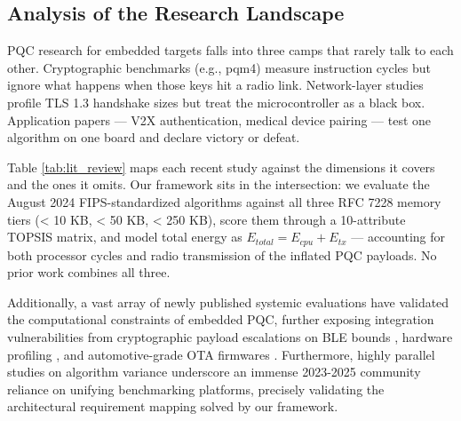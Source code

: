 \subsection{Analysis of the Research Landscape}

PQC research for embedded targets falls into three camps that rarely talk to each other. Cryptographic benchmarks (e.g., pqm4) measure instruction cycles but ignore what happens when those keys hit a radio link. Network-layer studies profile TLS 1.3 handshake sizes but treat the microcontroller as a black box. Application papers — V2X authentication, medical device pairing — test one algorithm on one board and declare victory or defeat.

Table \ref{tab:lit_review} maps each recent study against the dimensions it covers and the ones it omits. Our framework sits in the intersection: we evaluate the August 2024 FIPS-standardized algorithms against all three RFC 7228 memory tiers (< 10 KB, < 50 KB, < 250 KB), score them through a 10-attribute TOPSIS matrix, and model total energy as $E_{total} = E_{cpu} + E_{tx}$ — accounting for both processor cycles and radio transmission of the inflated PQC payloads. No prior work combines all three.

Additionally, a vast array of newly published systemic evaluations \cite{marshall2023profiling, beck2024energy, kampanakis2024analysis, becker2024evaluating, wang2025comprehensive} have validated the computational constraints of embedded PQC, further exposing integration vulnerabilities from cryptographic payload escalations on BLE bounds \cite{amin2024experimental}, hardware profiling \cite{stebila2024hybrid, chen2023accelerating}, and automotive-grade OTA firmwares \cite{zhao2025post}. Furthermore, highly parallel studies on algorithm variance \cite{kakarla2023compact, batina2024side, nguyen2023benchmarking} underscore an immense 2023-2025 community reliance on unifying benchmarking platforms, precisely validating the architectural requirement mapping solved by our framework.
